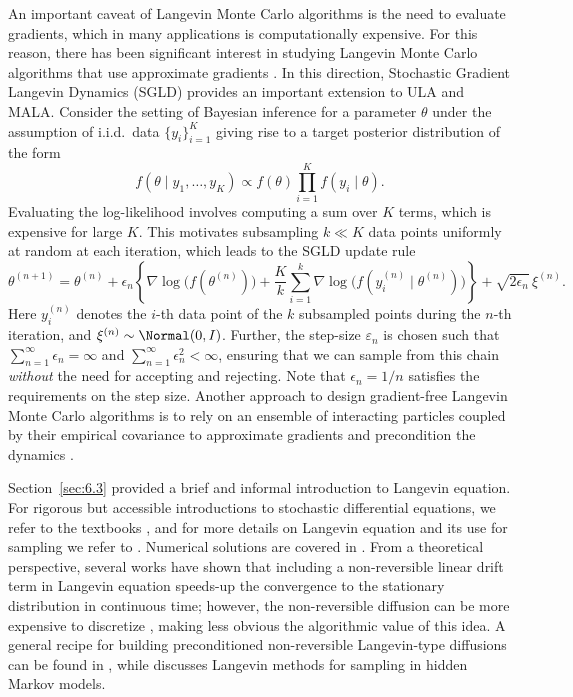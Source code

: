 An important caveat of Langevin Monte Carlo algorithms is the need to evaluate gradients, which
in many applications is computationally expensive. For this reason, there has been significant
interest in studying Langevin Monte Carlo algorithms that use approximate gradients \cite{53}.
In this direction, Stochastic Gradient Langevin Dynamics (SGLD) \cite{236} provides an
important extension to ULA and MALA. Consider the setting of Bayesian inference for a
parameter $\theta$ under the assumption of i.i.d.\ data $\{y_i\}_{i=1}^K$ giving rise to a
target posterior distribution of the form
\[
  f(\theta \mid y_1, \ldots, y_K) \propto f(\theta)\prod_{i=1}^K f(y_i \mid \theta).
\]
Evaluating the log-likelihood involves computing a sum over $K$ terms, which is expensive for
large $K$. This motivates subsampling $k \ll K$ data points uniformly at random at each
iteration, which leads to the SGLD update rule
\[
  \theta^{(n+1)} = \theta^{(n)} + \epsilon_n\left\{
    \nabla\log\bigl(f(\theta^{(n)})\bigr)
    + \frac{K}{k}\sum_{i=1}^k \nabla\log\bigl(f(y_i^{(n)} \mid \theta^{(n)})\bigr)
  \right\} + \sqrt{2\epsilon_n}\,\xi^{(n)}.
\]
Here $y_i^{(n)}$ denotes the $i$-th data point of the $k$ subsampled points during the $n$-th
iteration, and $\xi^{(n)} \sim \Normal(0, I)$. Further, the step-size $\varepsilon_n$ is
chosen such that $\sum_{n=1}^\infty \epsilon_n = \infty$ and $\sum_{n=1}^\infty \epsilon_n^2
< \infty$, ensuring that we can sample from this chain \emph{without} the need for accepting
and rejecting. Note that $\epsilon_n = 1/n$ satisfies the requirements on the step size.
Another approach to design gradient-free Langevin Monte Carlo algorithms is to rely on an
ensemble of interacting particles coupled by their empirical covariance to approximate gradients
and precondition the dynamics \cite{137,77,44}.

Section~\ref{sec:6.3} provided a brief and informal introduction to Langevin equation. For
rigorous but accessible introductions to stochastic differential equations, we refer to the
textbooks \cite{177,72,153}, and for more details on Langevin equation and its use for sampling
we refer to \cite{185}. Numerical solutions are covered in \cite{125,111}. From a theoretical
perspective, several works \cite{138,191} have shown that including a non-reversible linear
drift term in Langevin equation speeds-up the convergence to the stationary distribution in
continuous time; however, the non-reversible diffusion can be more expensive to discretize
\cite{79,78}, making less obvious the algorithmic value of this idea. A general recipe for
building preconditioned non-reversible Langevin-type diffusions can be found in \cite{150},
while \cite{151} discusses Langevin methods for sampling in hidden Markov models.
